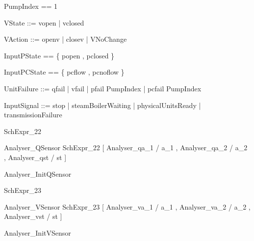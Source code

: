 \documentclass{article}
\begin{document}
\begin{zed}
	PumpIndex == 1 
\end{zed}

\begin{zed}
	VState ::= vopen | vclosed
\end{zed}

\begin{zed}
	VAction ::= openv | closev | VNoChange
\end{zed}

\begin{zed}
	InputPState == \{ popen , pclosed \}
\end{zed}

\begin{zed}
	InputPCState == \{ pcflow , pcnoflow \}
\end{zed}

\begin{zed}
	UnitFailure ::= qfail | vfail | pfail \ldata PumpIndex \rdata | pcfail \ldata PumpIndex \rdata
\end{zed}

\begin{zed}
	InputSignal ::= stop | steamBoilerWaiting | physicalUnitsReady | transmissionFailure
\end{zed}

\begin{zed}
	SchExpr\_22 
\end{zed}

\begin{zed}
	Analyser\_QSensor  SchExpr\_22 [ Analyser\_qa\_1 / a\_1 , Analyser\_qa\_2 / a\_2 , Analyser\_qst / st ]
\end{zed}

\begin{zed}
	Analyser\_InitQSensor 
\end{zed}

\begin{zed}
	SchExpr\_23 
\end{zed}

\begin{zed}
	Analyser\_VSensor  SchExpr\_23 [ Analyser\_va\_1 / a\_1 , Analyser\_va\_2 / a\_2 , Analyser\_vst / st ]
\end{zed}

\begin{zed}
	Analyser\_InitVSensor 
\end{zed}
\end{document}

